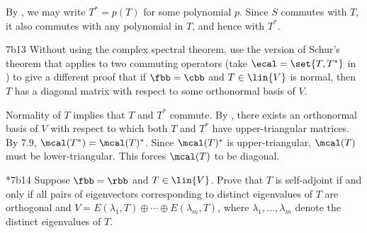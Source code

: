 \begin{sol}
    By , we may write $T^\ast = p(T)$ for some polynomial $p$.
    Since $S$ commutes with $T$, it also commutes with any polynomial in $T$, and hence with $T^\ast$.
\end{sol}

\begin{exercise}{7b13}
    Without using the complex spectral theorem, use the version of Schur's theorem that applies to two commuting operators (take $\ecal = \set{T, T^\ast}$ in ) to give a different proof that if $\fbb = \cbb$ and $T \in \lin{V}$ is normal, then $T$ has a diagonal matrix with respect to some orthonormal basis of $V$.
\end{exercise}

\begin{sol}
    Normality of $T$ implies that $T$ and $T^\ast$ commute.
    By , there exists an orthonormal basis of $V$ with respect to which both $T$ and $T^\ast$ have upper-triangular matrices.
    By 7.9, $\mcal(T^\ast) = \mcal(T)^\ast$.
    Since $\mcal(T)^\ast$ is upper-triangular, $\mcal(T)$ must be lower-triangular.
    This forces $\mcal(T)$ to be diagonal.
\end{sol}

\begin{exercise}*{7b14}
    Suppose $\fbb = \rbb$ and $T \in \lin{V}$.
    Prove that $T$ is self-adjoint if and only if all pairs of eigenvectors corresponding to distinct eigenvalues of $T$ are orthogonal and $V = E(\lambda_1, T) \oplus \cdots \oplus E(\lambda_m, T)$, where $\lambda_1, \ldots, \lambda_m$ denote the distinct eigenvalues of $T$.

\end{exercise}

